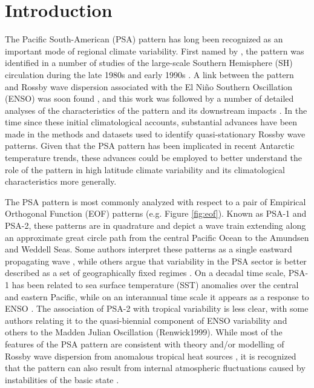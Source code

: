 \section{Introduction}

The Pacific South-American (PSA) pattern has long been recognized as an important mode of regional climate variability. First named by \citet{Mo1987}, the pattern was identified in a number of studies of the large-scale Southern Hemisphere (SH) circulation during the late 1980s and early 1990s \citep[e.g.][]{Lau1994}. A link between the pattern and Rossby wave dispersion associated with the El Ni\~{n}o Southern Oscillation (ENSO) was soon found \citep[e.g.][]{Karoly1989}, and this work was followed by a number of detailed analyses of the characteristics of the pattern and its downstream impacts \citep[e.g.][]{Mo1998,Mo2000,Mo2001}. In the time since these initial climatological accounts, substantial advances have been made in the methods and datasets used to identify quasi-stationary Rossby wave patterns. Given that the PSA pattern has been implicated in recent Antarctic temperature trends, these advances could be employed to better understand the role of the pattern in high latitude climate variability and its climatological characteristics more generally.

The PSA pattern is most commonly analyzed with respect to a pair of Empirical Orthogonal Function (EOF) patterns (e.g. Figure \ref{fig:eof}). Known as PSA-1 and PSA-2, these patterns are in quadrature and depict a wave train extending along an approximate great circle path from the central Pacific Ocean to the Amundsen and Weddell Seas. Some authors interpret these patterns as a single eastward propagating wave \citep{Mo1998}, while others argue that variability in the PSA sector is better described as a set of geographically fixed regimes \citep{Robertson2003}. On a decadal time scale, PSA-1 has been related to sea surface temperature (SST) anomalies over the central and eastern Pacific, while on an interannual time scale it appears as a response to ENSO \citep{Mo2001}. The association of PSA-2 with tropical variability is less clear, with some authors relating it to the quasi-biennial component of ENSO variability \citep{Mo2000} and others to the Madden Julian Oscillation (Renwick1999). While most of the features of the PSA pattern are consistent with theory and/or modelling of Rossby wave dispersion from anomalous tropical heat sources \citep[e.g.][]{Liu2007,Li2015}, it is recognized that the pattern can also result from internal atmospheric fluctuations caused by instabilities of the basic state \citep[and that both mechanisms likely act in concert; e.g.][]{Grimm2009}.

